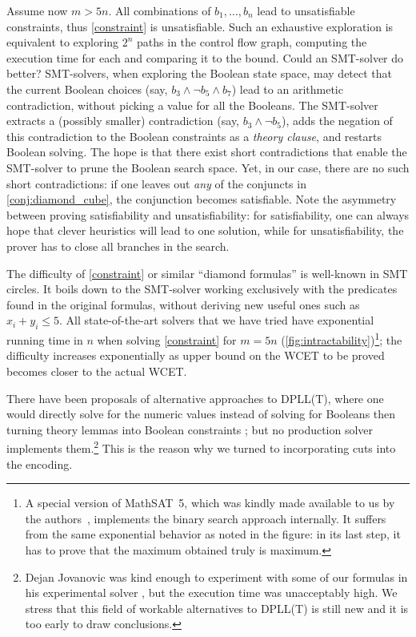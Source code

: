 \documentclass[a4paper,twocolumn,11pt]{article}
\begin{document}
Assume now $m > 5n$. All combinations of $b_1,\dots,b_n$ lead to unsatisfiable constraints, thus \autoref{constraint} is unsatisfiable. Such an exhaustive exploration is equivalent to exploring $2^n$ paths in the control flow graph, computing the execution time for each and comparing it to the bound. Could an SMT-solver do better?
SMT-solvers, when exploring the Boolean state space, may detect that the current Boolean choices (say, $b_3 \land \neg b_5 \land b_7$) lead to an arithmetic contradiction, without picking a value for all the Booleans. The SMT-solver extracts a (possibly smaller) contradiction (say, $b_3 \land \neg b_5$), adds the negation of this contradiction to the Boolean constraints as a \emph{theory clause}, and restarts Boolean solving.
The hope is that there exist short contradictions that enable the SMT-solver to prune the Boolean search space.
Yet, in our case, there are no such short contradictions: if one leaves out \emph{any} of the conjuncts in \autoref{conj:diamond_cube}, the conjunction becomes satisfiable.
Note the asymmetry between proving satisfiability and unsatisfiability: for satisfiability, one can always hope that clever heuristics will lead to one solution, while for unsatisfiability, the prover has to close all branches in the search.

The difficulty of \autoref{constraint} or similar ``diamond formulas'' is well-known in SMT circles.
It boils down to the SMT-solver working exclusively with the predicates found in the original formulas, without deriving new useful ones such as $x_i+y_i \leq 5$.
All state-of-the-art solvers that we have tried have exponential running time in $n$ when solving \autoref{constraint} for $m = 5n$ (\autoref{fig:intractability})\footnote{A special version of MathSAT~5, which was kindly made available to us by the authors~\parencite{Sebastiani_Tomasi_IJCAR12}, implements the binary search approach internally. It suffers from the same exponential behavior as noted in the figure: in its last step, it has to prove that the maximum obtained truly is maximum.};
the difficulty increases exponentially as upper bound on the WCET to be proved becomes closer to the actual WCET.

There have been proposals of alternative approaches to DPLL(T), where one would
directly solve for the numeric values instead of solving for Booleans then
turning theory lemmas into Boolean constraints
\parencite{Cotton_PhD,DBLP:conf/formats/Cotton10,DBLP:conf/cav/McMillanKS09,Bjorner_et_al_LPAR2008,DBLP:conf/vmcai/MouraJ13};
but no production solver implements them.\footnote{Dejan Jovanovic was kind enough to experiment with some of our formulas in his experimental solver \parencite{DBLP:conf/vmcai/MouraJ13}, but the execution time was unacceptably high. We stress that this field of workable alternatives to DPLL(T) is still new and it is too early to draw conclusions.}
This is the reason why we turned to incorporating cuts into the encoding.
\end{document}
